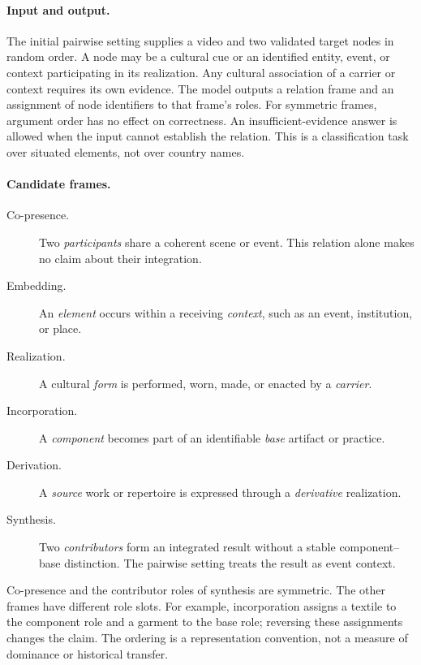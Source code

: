 \paragraph{Input and output.}
The initial pairwise setting supplies a video and two validated target nodes in random order.
A node may be a cultural cue or an identified entity, event, or context participating in its realization.
Any cultural association of a carrier or context requires its own evidence.
The model outputs a relation frame and an assignment of node identifiers to that frame's roles.
For symmetric frames, argument order has no effect on correctness.
An insufficient-evidence answer is allowed when the input cannot establish the relation.
This is a classification task over situated elements, not over country names.

\paragraph{Candidate frames.}
\begin{description}
    \item[Co-presence.] Two \emph{participants} share a coherent scene or event. This relation alone makes no claim about their integration.
    \item[Embedding.] An \emph{element} occurs within a receiving \emph{context}, such as an event, institution, or place.
    \item[Realization.] A cultural \emph{form} is performed, worn, made, or enacted by a \emph{carrier}.
    \item[Incorporation.] A \emph{component} becomes part of an identifiable \emph{base} artifact or practice.
    \item[Derivation.] A \emph{source} work or repertoire is expressed through a \emph{derivative} realization.
    \item[Synthesis.] Two \emph{contributors} form an integrated result without a stable component--base distinction. The pairwise setting treats the result as event context.
\end{description}
Co-presence and the contributor roles of synthesis are symmetric.
The other frames have different role slots.
For example, incorporation assigns a textile to the component role and a garment to the base role; reversing these assignments changes the claim.
The ordering is a representation convention, not a measure of dominance or historical transfer.


